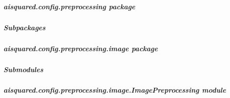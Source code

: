 \documentclass[letterpaper,10pt,english]{sphinxmanual}
\begin{document}
\sphinxstepscope


\subparagraph{aisquared.config.preprocessing package}
\label{\detokenize{aisquared.config.preprocessing:aisquared-config-preprocessing-package}}\label{\detokenize{aisquared.config.preprocessing::doc}}

\subparagraph{Subpackages}
\label{\detokenize{aisquared.config.preprocessing:subpackages}}
\sphinxstepscope


\subparagraph{aisquared.config.preprocessing.image package}
\label{\detokenize{aisquared.config.preprocessing.image:aisquared-config-preprocessing-image-package}}\label{\detokenize{aisquared.config.preprocessing.image::doc}}

\subparagraph{Submodules}
\label{\detokenize{aisquared.config.preprocessing.image:submodules}}

\subparagraph{aisquared.config.preprocessing.image.ImagePreprocessing module}
\label{\detokenize{aisquared.config.preprocessing.image:module-aisquared.config.preprocessing.image.ImagePreprocessing}}\label{\detokenize{aisquared.config.preprocessing.image:aisquared-config-preprocessing-image-imagepreprocessing-module}}
\end{document}
